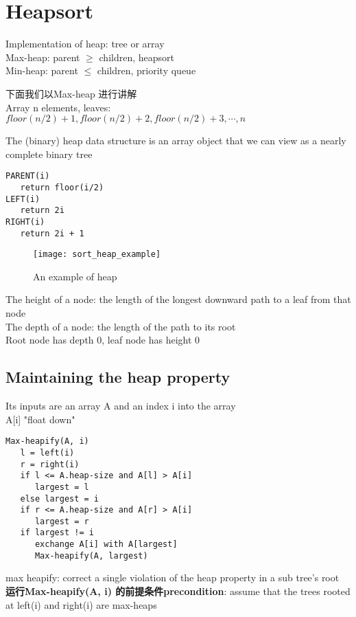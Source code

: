 \documentclass{article}
\begin{document}
\section{Heapsort}
Implementation of heap: tree or array\\
Max-heap: parent $\geq$ children,
	heapsort\\
Min-heap: parent $\leq$ children,
	priority queue

下面我们以Max-heap 进行讲解\\
Array n elements, leaves: $floor(n/2) + 1, floor(n/2) + 2, floor(n/2) + 3, \cdots, n$

The (binary) heap data structure is an array object that we can view as a nearly complete binary tree
\begin{verbatim}
PARENT(i)
   return floor(i/2)
LEFT(i)
   return 2i
RIGHT(i)
   return 2i + 1
\end{verbatim}

\begin{figure}[htbp]
  \centering
  \texttt{[image: sort\_heap\_example]}
  \caption{An example of heap}\label{fig.sort.heap.example}
\end{figure}

\noindent
The height of a node: the length of the longest downward path to a leaf from that node\\
The depth of a node: the length of the path to its root\\
Root node has depth 0, leaf node has height 0

\subsection{Maintaining the heap property}
Its inputs are an array A and an index i into the array\\
A[i] "float down"

\begin{verbatim}
Max-heapify(A, i)
   l = left(i)
   r = right(i)
   if l <= A.heap-size and A[l] > A[i]
      largest = l
   else largest = i
   if r <= A.heap-size and A[r] > A[i]
      largest = r
   if largest != i
      exchange A[i] with A[largest]
      Max-heapify(A, largest)
\end{verbatim}

max heapify: correct a single violation of the heap property in a sub tree's root\\
\textbf{运行Max-heapify(A, i) 的前提条件precondition}: assume that the trees rooted at left(i) and right(i) are max-heaps
\end{document}
